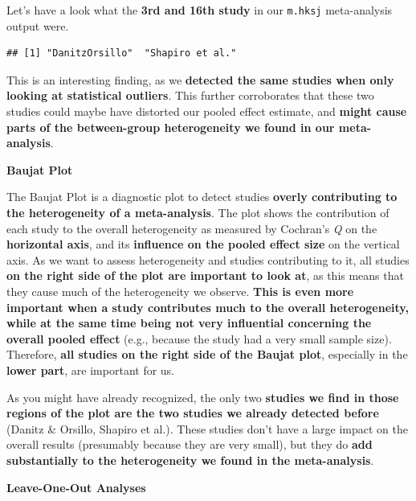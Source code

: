 \documentclass[]{book}
\newenvironment{Shaded}{\begin{snugshade}}{\end{snugshade}}
\newcommand{\DecValTok}[1]{\textcolor[rgb]{0.00,0.00,0.81}{#1}}
\newcommand{\KeywordTok}[1]{\textcolor[rgb]{0.13,0.29,0.53}{\textbf{#1}}}
\newcommand{\NormalTok}[1]{#1}
\newcommand{\OperatorTok}[1]{\textcolor[rgb]{0.81,0.36,0.00}{\textbf{#1}}}
\begin{document}
Let's have a look what the \textbf{3rd and 16th study} in our \texttt{m.hksj} meta-analysis output were.

\begin{Shaded}
\end{Shaded}

\begin{verbatim}
## [1] "DanitzOrsillo"  "Shapiro et al."
\end{verbatim}

This is an interesting finding, as we \textbf{detected the same studies when only looking at statistical outliers}. This further corroborates that these two studies could maybe have distorted our pooled effect estimate, and \textbf{might cause parts of the between-group heterogeneity we found in our meta-analysis}.

\textbf{Baujat Plot}

The Baujat Plot \citep{baujat2002graphical} is a diagnostic plot to detect studies \textbf{overly contributing to the heterogeneity of a meta-analysis}. The plot shows the contribution of each study to the overall heterogeneity as measured by Cochran's \emph{Q} on the \textbf{horizontal axis}, and its \textbf{influence on the pooled effect size} on the vertical axis. As we want to assess heterogeneity and studies contributing to it, all studies \textbf{on the right side of the plot are important to look at}, as this means that they cause much of the heterogeneity we observe. \textbf{This is even more important when a study contributes much to the overall heterogeneity, while at the same time being not very influential concerning the overall pooled effect} (e.g., because the study had a very small sample size). Therefore, \textbf{all studies on the right side of the Baujat plot}, especially in the \textbf{lower part}, are important for us.

As you might have already recognized, the only two \textbf{studies we find in those regions of the plot are the two studies we already detected before} (Danitz \& Orsillo, Shapiro et al.). These studies don't have a large impact on the overall results (presumably because they are very small), but they do \textbf{add substantially to the heterogeneity we found in the meta-analysis}.

\textbf{Leave-One-Out Analyses}
\end{document}
